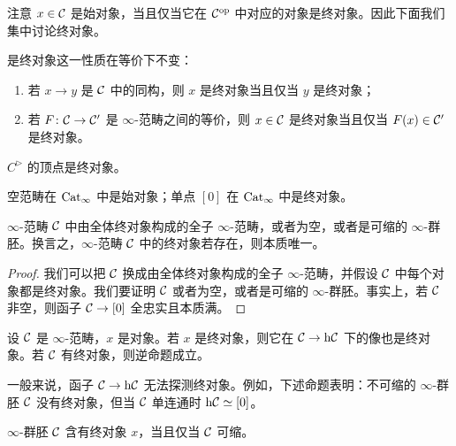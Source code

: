 \nitem\label{L6-2.3} 注意 $x\in\mathcal{C}$ 是始对象，当且仅当它在 $\mathcal{C}^{\mathrm{op}}$ 中对应的对象是终对象。因此下面我们集中讨论终对象。

\begin{exercise}\label{L6-2.4}
是终对象这一性质在等价下不变：
\begin{enumerate}[label=(\arabic*),leftmargin=2.4em,itemsep=0.1em]
\item 若 $x\to y$ 是 $\mathcal{C}$ 中的同构，则 $x$ 是终对象当且仅当 $y$ 是终对象；
\item 若 $F\colon\mathcal{C}\to\mathcal{C}'$ 是 $\infty$-范畴之间的等价，则 $x\in\mathcal{C}$ 是终对象当且仅当 $F(x)\in\mathcal{C}'$ 是终对象。
\end{enumerate}
\end{exercise}

\begin{exercise}\label{L6-2.5}
$C^{\triangleright}$ 的顶点是终对象。
\end{exercise}

\begin{example}\label{L6-2.6}
空范畴在 $\operatorname{Cat}_\infty$ 中是始对象；单点 $[0]$ 在 $\operatorname{Cat}_\infty$ 中是终对象。
\end{example}

\begin{proposition}\label{L6-2.7}
$\infty$-范畴 $\mathcal{C}$ 中由全体终对象构成的全子 $\infty$-范畴，或者为空，或者是可缩的 $\infty$-群胚。换言之，$\infty$-范畴 $\mathcal{C}$ 中的终对象若存在，则本质唯一。
\end{proposition}

\begin{proof}
我们可以把 $\mathcal{C}$ 换成由全体终对象构成的全子 $\infty$-范畴，并假设 $\mathcal{C}$ 中每个对象都是终对象。我们要证明 $\mathcal{C}$ 或者为空，或者是可缩的 $\infty$-群胚。事实上，若 $\mathcal{C}$ 非空，则函子 $\mathcal{C}\to[0]$ 全忠实且本质满。
\end{proof}

\begin{exercise}\label{L6-2.8}
设 $\mathcal{C}$ 是 $\infty$-范畴，$x$ 是对象。若 $x$ 是终对象，则它在 $\mathcal{C}\to\mathrm{h}\mathcal{C}$ 下的像也是终对象。若 $\mathcal{C}$ 有终对象，则逆命题成立。
\end{exercise}

\begin{warning}\label{L6-2.9}
一般来说，函子 $\mathcal{C}\to\mathrm{h}\mathcal{C}$ 无法探测终对象。例如，下述命题表明：不可缩的 $\infty$-群胚 $\mathcal{C}$ 没有终对象，但当 $\mathcal{C}$ 单连通时 $\mathrm{h}\mathcal{C}\simeq[0]$。
\end{warning}

\begin{proposition}\label{L6-2.10}
$\infty$-群胚 $\mathcal{C}$ 含有终对象 $x$，当且仅当 $\mathcal{C}$ 可缩。
\end{proposition}

